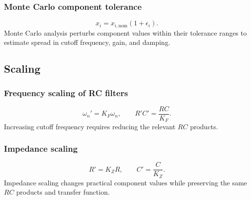 \subsubsection{Monte Carlo component tolerance}
\[
x_i=x_{i,\mathrm{nom}}(1+\epsilon_i).
\]
Monte Carlo analysis perturbs component values within their tolerance ranges to estimate spread in cutoff frequency, gain, and damping.

\subsection{Scaling}

\subsubsection{Frequency scaling of RC filters}
\[
\omega_n' = K_F\omega_n,\qquad
R'C'=\frac{RC}{K_F}.
\]
Increasing cutoff frequency requires reducing the relevant \(RC\) products.

\subsubsection{Impedance scaling}
\[
R'=K_ZR,\qquad C'=\frac{C}{K_Z}.
\]
Impedance scaling changes practical component values while preserving the same \(RC\) products and transfer function.
